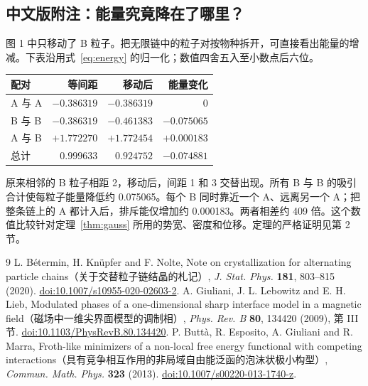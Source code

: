\documentclass[11pt]{article}
\theoremstyle{definition}
\begin{document}
\subsection*{中文版附注：能量究竟降在了哪里？}
图 1 中只移动了 B 粒子。把无限链中的粒子对按物种拆开，可直接看出能量的增减。下表沿用式~\eqref{eq:energy} 的归一化；数值四舍五入至小数点后六位。
\begin{center}
\renewcommand{\arraystretch}{1.25}
\begin{tabular}{lrrr}
\hline
配对 & 等间距 & 移动后 & 能量变化 \\
\hline
A 与 A & $-0.386319$ & $-0.386319$ & $0$ \\
B 与 B & $-0.386319$ & $-0.461383$ & $-0.075065$ \\
A 与 B & $+1.772270$ & $+1.772454$ & $+0.000183$ \\
\hline
总计 & $0.999633$ & $0.924752$ & $-0.074881$ \\
\hline
\end{tabular}
\end{center}
原来相邻的 B 粒子相距 2，移动后，间距 1 和 3 交替出现。所有 B 与 B 的吸引合计使每粒子能量降低约 0.075065。每个 B 同时靠近一个 A、远离另一个 A；把整条链上的 A 都计入后，排斥能仅增加约 0.000183。两者相差约 409 倍。这个数值比较针对定理~\ref{thm:gauss} 所用的势宽、密度和位移。定理的严格证明见第 2 节。
\begin{thebibliography}{9}
 L. Bétermin, H. Knüpfer and F. Nolte, Note on crystallization for alternating particle chains（关于交替粒子链结晶的札记）, \emph{J. Stat. Phys.} \textbf{181}, 803--815 (2020). \href{https://doi.org/10.1007/s10955-020-02603-2}{doi:10.1007/s10955-020-02603-2}.
 A. Giuliani, J. L. Lebowitz and E. H. Lieb, Modulated phases of a one-dimensional sharp interface model in a magnetic field（磁场中一维尖界面模型的调制相）, \emph{Phys. Rev. B} \textbf{80}, 134420 (2009), 第 III 节. \href{https://doi.org/10.1103/PhysRevB.80.134420}{doi:10.1103/PhysRevB.80.134420}.
 P. Buttà, R. Esposito, A. Giuliani and R. Marra, Froth-like minimizers of a non-local free energy functional with competing interactions（具有竞争相互作用的非局域自由能泛函的泡沫状极小构型）, \emph{Commun. Math. Phys.} \textbf{323} (2013). \href{https://doi.org/10.1007/s00220-013-1740-z}{doi:10.1007/s00220-013-1740-z}.
\end{thebibliography}
\end{document}
